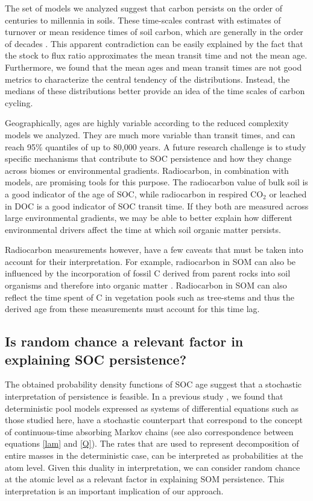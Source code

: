 \documentclass[draft,linenumbers]{agujournal}
\providecommand{\DIFadd}[1]{{\protect\color{blue}\uwave{#1}}} %
\providecommand{\DIFaddbegin}{} %
\providecommand{\DIFaddend}{} %
\begin{document}
The set of models we analyzed suggest that carbon persists on the order of centuries to millennia in soils. These time-scales contrast with estimates of turnover or mean residence times of soil carbon, which are generally in the order of decades \citep{Carvalhais2014, Wang2018}. This apparent contradiction can be easily explained by the fact that the stock to flux ratio approximates the mean transit time and not the mean age. Furthermore, we found that the mean ages and mean transit times are not good metrics to characterize the central tendency of the distributions. Instead, the medians of these distributions better provide an idea of the \DIFaddbegin \DIFadd{central tendency of }\DIFaddend time scales of carbon cycling. 

Geographically, ages are highly variable according to the reduced complexity models we analyzed. They are much more variable than transit times, and can reach 95\% quantiles of up to 80,000 years. A future research challenge is to study specific mechanisms that contribute to SOC persistence and how they change across biomes or environmental gradients. Radiocarbon, in combination with models, are promising tools for this purpose. The radiocarbon value of bulk soil is a good indicator of the age of SOC, while radiocarbon in respired CO$_2$ or leached in DOC is a good indicator of SOC transit time. If they both are measured across large environmental gradients, we may be able to better explain how different environmental drivers affect the time at which soil organic matter persists. 

Radiocarbon measurements however, have a few caveats that must be taken into account for their interpretation. For example, radiocarbon in SOM can also be influenced by the incorporation  of fossil C derived from parent rocks into soil organisms and therefore into organic matter \citep{Seifert2013}. Radiocarbon in SOM can also reflect the time spent of C in vegetation pools such as tree-stems and thus the derived age from these measurements must account for this time lag.

\subsection{Is random chance a relevant factor in explaining SOC persistence?}
The obtained probability density functions of SOC age suggest that a stochastic interpretation of persistence is feasible. In a previous study \citep{Metzler2018MG}, we found that deterministic pool models expressed as systems of differential equations such as those studied here, have a stochastic counterpart that correspond to the concept of continuous-time absorbing Markov chains (see also correspondence between equations \ref{lam} and \ref{Q}). The rates that are used to represent decomposition of entire masses in the deterministic case, can be interpreted as probabilities at the atom level. Given this duality in interpretation, we can consider random chance at the atomic level as a relevant factor in explaining SOM persistence. This interpretation is an important implication of our approach. 
\end{document}
